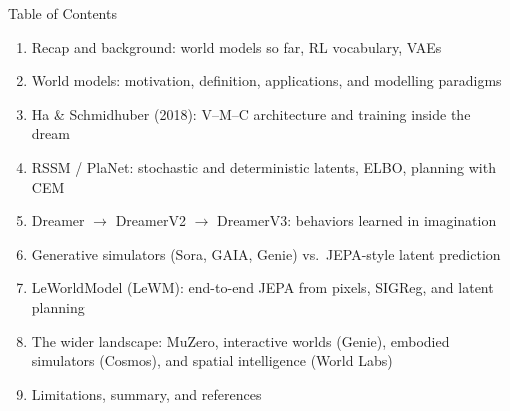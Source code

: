 \begin{frame}{Table of Contents}
  \begin{enumerate}\itemsep0.15em
    \item Recap and background: world models so far, RL vocabulary, VAEs
    \item World models: motivation, definition, applications, and modelling paradigms
    \item Ha \& Schmidhuber (2018): V--M--C architecture and training inside the dream
    \item RSSM / PlaNet: stochastic and deterministic latents, ELBO, planning with CEM
    \item Dreamer $\rightarrow$ DreamerV2 $\rightarrow$ DreamerV3: behaviors learned in imagination
    \item Generative simulators (Sora, GAIA, Genie) vs.\ JEPA-style latent prediction
    \item LeWorldModel (LeWM): end-to-end JEPA from pixels, SIGReg, and latent planning
    \item The wider landscape: MuZero, interactive worlds (Genie), embodied simulators (Cosmos), and spatial intelligence (World Labs)
    \item Limitations, summary, and references
  \end{enumerate}
\end{frame}
